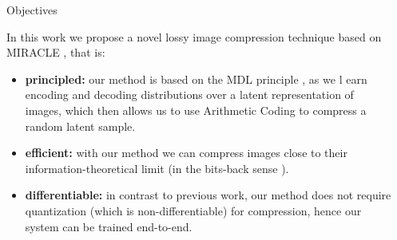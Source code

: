 \documentclass[final]{beamer}
\newlength{\sepwid}
\newlength{\onecolwid}
\begin{document}
\begin{frame}[t] %

\begin{columns}[t] %

\begin{column}{\sepwid}\end{column} %

\begin{column}{\onecolwid} %


\begin{alertblock}{Objectives}

In this work we propose a novel lossy image compression technique based on
MIRACLE \cite{havasi2018minimal}, that is:
\begin{itemize}
\item \textbf{principled:} our method is based on the MDL principle
  \cite{hinton1993keeping}, as we
  l earn encoding and decoding distributions over a latent representation of
  images, which then allows us to use Arithmetic Coding to compress a random
  latent sample.
\item \textbf{efficient:} with our method we can compress images close to their
  information-theoretical limit (in the bits-back sense \cite{hinton1993keeping}).
\item \textbf{differentiable:} in contrast to previous work, our method does not
  require quantization (which is non-differentiable) for compression, hence our
  system can be trained end-to-end.
\end{itemize}

\end{alertblock}



\end{column}
\end{columns}
\end{frame}
\end{document}
